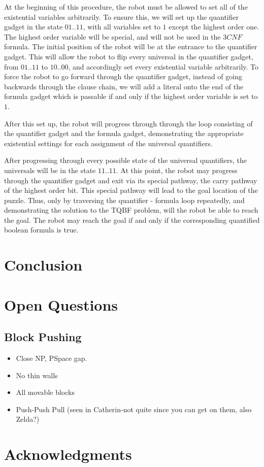 \documentclass[11pt]{article}
\begin{document}
At the beginning of this procedure, the robot must be allowed to set all of the existential variables arbitrarily.
To ensure this, we will set up the quantifier gadget in the state $01 .. 11$, with all variables set to $1$
except the highest order one.  The highest order variable will be special, and will not be used in the $3CNF$
formula. The initial position of the robot will be at the entrance to the quantifier gadget. This will allow
the robot to flip every universal in the quantifier gadget, from $01 .. 11$ to $10 .. 00$, and accordingly
set every existential variable arbitrarily. To force the robot to go forward through the quantifier gadget,
instead of going backwards through the clause chain, we will add a literal onto the end of the formula gadget
which is passable if and only if the highest order variable is set to $1$.

After this set up, the robot will progress through through the loop consisting of the quantifier gadget and the
formula gadget, demonstrating the appropriate existential settings for each assignment of the universal
quantifiers.

After progressing through every possible state of the universal quantifiers, the universals will be in the
state $11 .. 11$. At this point, the robot may progress through the quantifier gadget and exit via its special
pathway,
the carry pathway of the highest order bit. This special pathway will lead to the goal location of the puzzle.
Thus, only by traversing the quantifier - formula loop repeatedly, and demonstrating the solution to the TQBF
problem,
will the robot be able to reach the goal. The robot may reach the goal if and only if the corresponding quantified
boolean formula is true.
\section{Conclusion}

\section{Open Questions}

\subsection{Block Pushing}
\begin{itemize}
\item Close NP, PSpace gap.
\item No thin walls
\item All movable blocks
\item Push-Push Pull (seen in Catherin-not quite since you can get on them, also Zelda?)
\end{itemize}

\section{Acknowledgments}





{}
\end{document}
